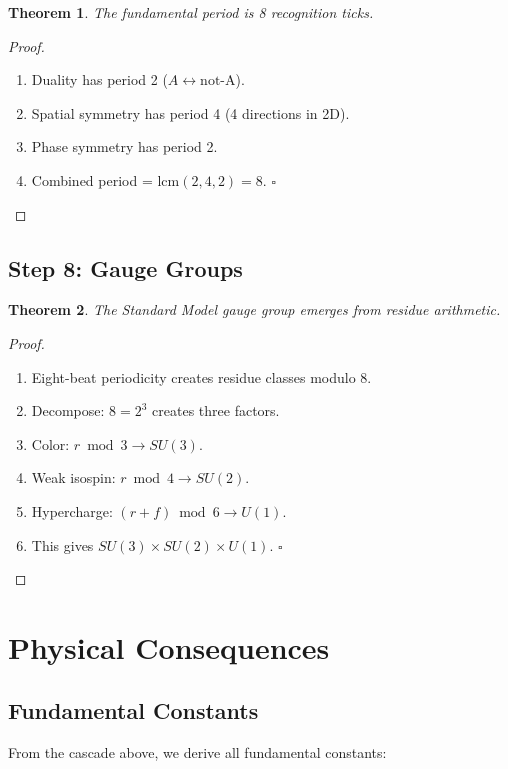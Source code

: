 \documentclass[12pt,a4paper]{article}
\newtheorem{theorem}{Theorem}
\begin{document}
\begin{theorem}
The fundamental period is 8 recognition ticks.
\end{theorem}

\begin{proof}
\begin{enumerate}
\item Duality has period 2 ($A \leftrightarrow \text{not-A}$).
\item Spatial symmetry has period 4 (4 directions in 2D).
\item Phase symmetry has period 2.
\item Combined period = $\text{lcm}(2,4,2) = 8$. $\square$
\end{enumerate}
\end{proof}

\subsection{Step 8: Gauge Groups}

\begin{theorem}
The Standard Model gauge group emerges from residue arithmetic.
\end{theorem}

\begin{proof}
\begin{enumerate}
\item Eight-beat periodicity creates residue classes modulo 8.
\item Decompose: $8 = 2^3$ creates three factors.
\item Color: $r \bmod 3 \to SU(3)$.
\item Weak isospin: $r \bmod 4 \to SU(2)$.
\item Hypercharge: $(r+f) \bmod 6 \to U(1)$.
\item This gives $SU(3) \times SU(2) \times U(1)$. $\square$
\end{enumerate}
\end{proof}

\section{Physical Consequences}

\subsection{Fundamental Constants}

From the cascade above, we derive all fundamental constants:
\end{document}
